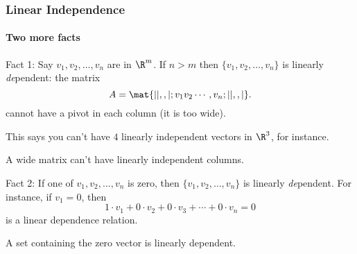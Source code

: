 \begin{frame}
\frametitle{Linear Independence}
\framesubtitle{Two more facts}

\displayskips{3pt}
\alert{Fact 1:} Say $v_1,v_2,\ldots,v_n$ are in $\R^m$.  If $n > m$ then
$\{v_1,v_2,\ldots,v_n\}$ is linearly
\pause
\textit{de}pendent: the matrix
\[ A = \mat{| |, , |; v_1 v_2 \cdots, v_n; | |, , |}. \]
cannot have a pivot in each column
\pause
(it is too wide).

\pause\medskip
This says you can't have $4$ linearly independent vectors in $\R^3$, for
instance.

\pause
\begin{bluebox}{.8\linewidth}
  A wide matrix can't have linearly independent columns.
\end{bluebox}

\pause\medskip
\alert{Fact 2:} If one of $v_1,v_2,\ldots,v_n$ is zero, then 
$\{v_1,v_2,\ldots,v_n\}$ is linearly
\pause
\textit{de}pendent.  For instance, if $v_1 = 0$, then
\pause
\[ 1\cdot v_1 + 0\cdot v_2 + 0\cdot v_3 + \cdots + 0\cdot v_n = 0 \]
is a linear dependence relation.

\pause
\begin{bluebox}{.8\linewidth}
  A set containing the zero vector is linearly dependent.
\end{bluebox}

\end{frame}


